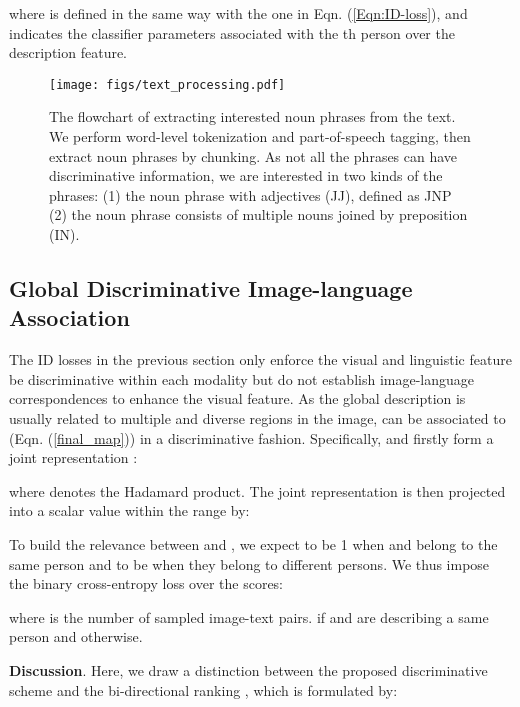 \documentclass[runningheads]{llncs}
\begin{document}
where  is defined in the same way with the one in Eqn. (\ref{Eqn:ID-loss}), and  indicates the classifier parameters associated with the th person over the description feature.
 
 \begin{figure}[t]
 \vspace{-1em}
 \centering
\texttt{[image: figs/text\_processing.pdf]}
 \vspace{-1em}
 \caption{The flowchart of extracting interested noun phrases from the text. We perform  word-level tokenization and part-of-speech tagging, then extract noun phrases by chunking. As not all the phrases can have discriminative information, we are interested in two kinds of the phrases: (1) the noun phrase with adjectives (JJ), defined as JNP (2) the noun phrase consists of multiple nouns joined by preposition (IN).}  \label{fig:noun-phrase-extraction} 
\vspace{-1em}
\end{figure}

\subsection{Global Discriminative Image-language Association}

The ID losses in the previous section only enforce the visual and linguistic feature be discriminative within each modality but do not establish image-language correspondences to enhance the visual feature. As the global description is usually related to multiple and diverse regions in the image,   can be associated to  (Eqn. (\ref{final_map})) in a discriminative fashion. Specifically,  and  firstly form a joint representation  :

where  denotes the Hadamard product. The joint representation is then projected into a scalar value within the range  by:

To build the relevance between  and , we expect  to be 1 when  and  belong to the same person and to be  when they belong to different persons. We thus impose the binary cross-entropy loss over the scores:

where  is the number of sampled image-text pairs.   if  and  are describing a same person and  otherwise.



\noindent \textbf{Discussion}.  Here, we draw a distinction between the proposed discriminative scheme  and the bi-directional ranking \cite{Karpathy:2014,reed2016learning, Dual-path}, which is formulated by:
\end{document}
